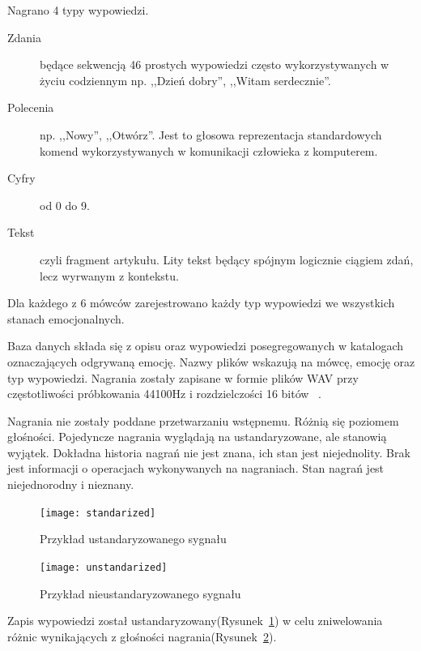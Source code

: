 \documentclass[a4paper,12pt,twoside,openany]{report}
\newcommand{\Rys}[1]{(Rysunek~\ref{#1})}
\begin{document}
Nagrano 4 typy wypowiedzi.
\begin{description}
	\item [Zdania] będące sekwencją 46 prostych wypowiedzi często wykorzystywanych w życiu codziennym 
		np. ,,Dzień dobry'', ,,Witam serdecznie''. 
	\item [Polecenia]  np. ,,Nowy'', ,,Otwórz''. 
		Jest to głosowa reprezentacja standardowych komend wykorzystywanych w komunikacji człowieka z komputerem.
	\item [Cyfry] od 0 do 9.
	\item [Tekst] czyli fragment artykułu. 
		Lity tekst będący spójnym logicznie ciągiem zdań, lecz wyrwanym z kontekstu.
\end{description}
Dla każdego z 6 mówców zarejestrowano każdy typ wypowiedzi we wszystkich stanach emocjonalnych.

Baza danych składa się z opisu oraz wypowiedzi posegregowanych w katalogach oznaczających odgrywaną emocję.
Nazwy plików wskazują na mówcę, emocję oraz typ wypowiedzi.
Nagrania zostały zapisane w formie plików WAV przy częstotliwości próbkowania 44100Hz i rozdzielczości 16 bitów ~\cite{Igras2009}.

Nagrania nie zostały poddane przetwarzaniu wstępnemu. 
Różnią się poziomem głośności.
Pojedyncze nagrania wyglądają na ustandaryzowane, ale stanowią wyjątek.
Dokładna historia nagrań nie jest znana, ich stan jest niejednolity.
Brak jest informacji o operacjach wykonywanych na nagraniach.
Stan nagrań jest niejednorodny i nieznany.
\begin{figure}[h]
	\centering
	\texttt{[image: standarized]}
	\caption{Przykład ustandaryzowanego sygnału}
	\label{rys:opis:ustandaryzowany}
\end{figure}
\begin{figure}[h]
	\centering
	\texttt{[image: unstandarized]}
	\caption{Przykład nieustandaryzowanego sygnału}
	\label{rys:opis:nieustandaryzowany}
\end{figure}

Zapis wypowiedzi został ustandaryzowany\Rys{rys:opis:ustandaryzowany} w celu zniwelowania różnic wynikających z głośności nagrania\Rys{rys:opis:nieustandaryzowany}.
\end{document}
